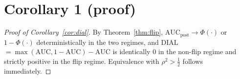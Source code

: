 \documentclass[11pt,a4paper]{article}
\begin{document}
\section{Corollary 1 (proof)}

\begin{proof}[Proof of Corollary~\ref{cor:dial}]
By Theorem~\ref{thm:flip},
$\mathrm{AUC}_{\text{post}}\to\Phi(\cdot)$ or $1-\Phi(\cdot)$ deterministically
in the two regimes, and DIAL$=\max(\mathrm{AUC},1-\mathrm{AUC})-\mathrm{AUC}$
is identically $0$ in the non-flip regime and strictly positive in the
flip regime. Equivalence with $\rho^2>\tfrac12$ follows immediately.
\end{proof}
\end{document}
